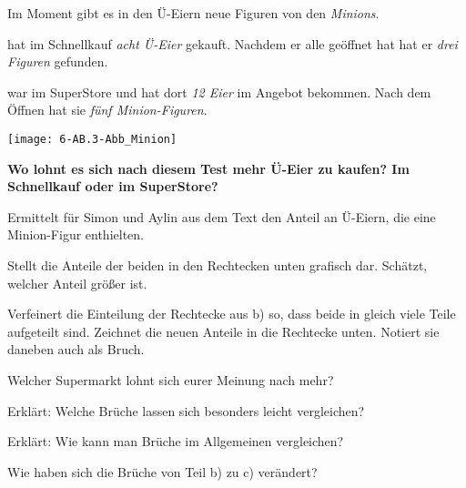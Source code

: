 \documentclass[13pt, a4paper, ngerman]{arbeitsblatt}
\begin{document}
\ReiheTitel

\bigskip
\begin{minipage}{0.79\textwidth}
	Im Moment gibt es in den Ü-Eiern neue Figuren von den \emph{Minions}.

	\medskip
	 hat im Schnellkauf \emph{acht Ü-Eier} gekauft. Nachdem er alle geöffnet hat hat er \emph{drei Figuren} gefunden.

	\medskip
	 war im SuperStore und hat dort \emph{12 Eier} im Angebot bekommen. Nach dem Öffnen hat sie \emph{fünf Minion-Figuren}.
\end{minipage} \hfill
\begin{minipage}{0.2\textwidth}
	\begin{center}
		\texttt{[image: 6-AB.3-Abb\_Minion]}
	\end{center}
\end{minipage}

\bigskip
\textbf{Wo lohnt es sich nach diesem Test mehr Ü-Eier zu kaufen? Im Schnellkauf oder im SuperStore?}

\begin{teilaufgaben}
	\item Ermittelt für Simon und Aylin aus dem Text den Anteil an Ü-Eiern, die eine Minion-Figur enthielten.
	\item Stellt die Anteile der beiden in den Rechtecken unten grafisch dar. Schätzt, welcher Anteil größer ist.

	\begin{center}
		\hspace{1cm}
	\end{center}
	\item Verfeinert die Einteilung der Rechtecke aus b) so, dass beide in gleich viele Teile aufgeteilt sind. Zeichnet die neuen Anteile in die Rechtecke unten. Notiert sie daneben auch als Bruch.

	\begin{center}
		\hspace{1cm}
	\end{center}
	\item Welcher Supermarkt lohnt sich eurer Meinung nach mehr?

	\begin{center}
		\linie
	\end{center}
	\item Erklärt: Welche Brüche lassen sich besonders leicht vergleichen?
	\item[\textcolor{ab.aufgabe.icons}\iconStern] Erklärt: Wie kann man Brüche im Allgemeinen vergleichen?
	\item[\textcolor{ab.aufgabe.icons}\iconStern] Wie haben sich die Brüche von Teil b) zu c) verändert?
\end{teilaufgaben}
\end{document}
